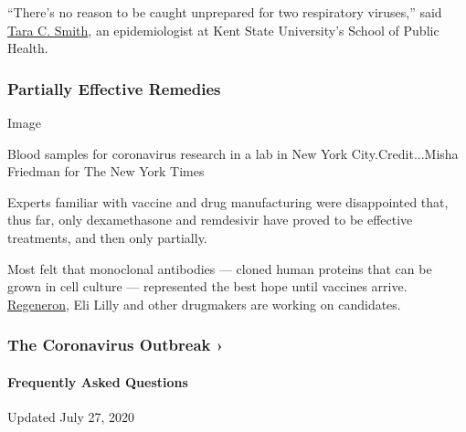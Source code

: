 ``There's no reason to be caught unprepared for two respiratory
viruses,'' said
\href{https://www.kent.edu/publichealth/profile/tara-c-smith-phd}{Tara
C. Smith}, an epidemiologist at Kent State University's School of Public
Health.

\hypertarget{partially-effective-remedies}{%
\subsubsection{Partially Effective
Remedies}\label{partially-effective-remedies}}

Image

Blood samples for coronavirus research in a lab in New York
City.Credit...Misha Friedman for The New York Times

Experts familiar with vaccine and drug manufacturing were disappointed
that, thus far, only dexamethasone and remdesivir have proved to be
effective treatments, and then only partially.

Most felt that monoclonal antibodies --- cloned human proteins that can
be grown in cell culture --- represented the best hope until vaccines
arrive.
\href{https://www.nytimes3xbfgragh.onion/2020/07/09/health/regeneron-monoclonal-antibodies.html}{Regeneron},
Eli Lilly and other drugmakers are working on candidates.

\href{https://www.nytimes3xbfgragh.onion/news-event/coronavirus?action=click\&pgtype=Article\&state=default\&region=MAIN_CONTENT_3\&context=storylines_faq}{}

\hypertarget{the-coronavirus-outbreak-}{%
\subsubsection{The Coronavirus Outbreak
›}\label{the-coronavirus-outbreak-}}

\hypertarget{frequently-asked-questions}{%
\paragraph{Frequently Asked
Questions}\label{frequently-asked-questions}}

Updated July 27, 2020

